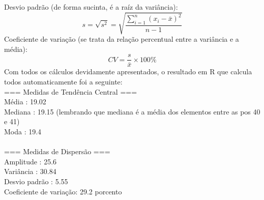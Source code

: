 \documentclass[12pt,a4paper]{article}
\begin{document}
  Desvio padrão (de forma sucinta, é a raíz da variância):
    \begin{equation}
    s = \sqrt{s^2} = \sqrt{\frac{\sum_{i=1}^{n} (x_i - \bar{x})^2}{n - 1}}
  \end{equation}
  Coeficiente de variação (se trata da relação percentual entre a variância e a média):
  \begin{equation}
    CV = \frac{s}{\bar{x}} \times 100\%
  \end{equation}
Com todos os cálculos devidamente apresentados, o resultado em R que calcula todos automaticamente foi a seguinte: \\
=== Medidas de Tendência Central ===\\
Média   : 19.02 \\
Mediana : 19.15 (lembrando que mediana é a média dos elementos entre as pos 40 e 41) \\
Moda    : 19.4\\ \\
=== Medidas de Dispersão ===\\
Amplitude             : 25.6 \\
Variância             : 30.84\\ 
Desvio padrão         : 5.55 \\
Coeficiente de variação: 29.2 porcento \\
\end{document}
